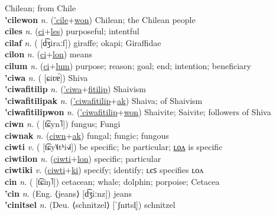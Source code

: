 Chilean; from Chile \label{'cileak} \\
\textbf{'cilewon} \textit{n.} (\hyperref['cile]{'cile}+\hyperref[won]{won})
Chilean; the Chilean people \label{'cilewon} \\
\textbf{ciles} \textit{n.} (\hyperref[ci]{ci}+\hyperref[les]{les})
purposeful; intentful \label{ciles} \\
\textbf{cilaf} \textit{n.} ( [d͡ʒiraːf])
giraffe; okapi; Giraffidae \label{cilaf} \\
\textbf{cilon} \textit{n.} (\hyperref[ci]{ci}+\hyperref[lon]{lon})
means \label{cilon} \\
\textbf{cilum} \textit{n.} (\hyperref[ci]{ci}+\hyperref[lum]{lum})
purpose; reason; goal; end; intention; beneficiary \label{cilum} \\
\textbf{'ciwa} \textit{n.} ( [ɕiʋɐ́])
Shiva \label{'ciwa} \\
\textbf{'ciwafitilip} \textit{n.} (\hyperref['ciwa]{'ciwa}+\hyperref[fitilip]{fitilip})
Shaivism \label{'ciwafitilip} \\
\textbf{'ciwafitilipak} \textit{n.} (\hyperref['ciwafitilip]{'ciwafitilip}+\hyperref[ak]{ak})
Shaiva; of Shaivism \label{'ciwafitilipak} \\
\textbf{'ciwafitilipwon} \textit{n.} (\hyperref['ciwafitilip]{'ciwafitilip}+\hyperref[won]{won})
Shaivite; Saivite; followers of Shiva \label{'ciwafitilipwon} \\
\textbf{ciwn} \textit{n.} ( [t͡ɕyn˥])
fungus; Fungi \label{ciwn} \\
\textbf{ciwnak} \textit{n.} (\hyperref[ciwn]{ciwn}+\hyperref[ak]{ak})
fungal; fungic; fungous \label{ciwnak} \\
\textbf{ciwti} \textit{v.} ( [t͡ɕy˥˩tʰi˧˩˧])
be specific; be particular; \hyperref[ciwtilon]{ʟᴏᴧ} is specific \label{ciwti} \\
\textbf{ciwtilon} \textit{n.} (\hyperref[ciwti]{ciwti}+\hyperref[lon]{lon})
specific; particular \label{ciwtilon} \\
\textbf{ciwtiki} \textit{v.} (\hyperref[ciwti]{ciwti}+\hyperref[ki]{ki})
specify; identify; ʟєꜱ specifies ʟᴏᴧ \label{ciwtiki} \\
\textbf{cin} \textit{n.} ( [t͡ɕiŋ˥])
cetacean; whale; dolphin; porpoise; Cetacea \label{cin} \\
\textbf{'cin} \textit{n.} (Eng. ⟨jeans⟩ [d͡ʒiːnz])
jeans \label{'cin} \\
\textbf{'cinitsel} \textit{n.} (Deu. ⟨schnitzel⟩ [ˈʃnɪtsl̩])
schnitzel \label{'cinitsel} \\
